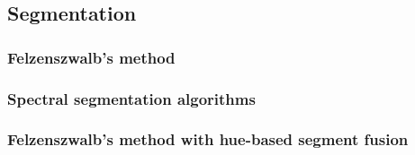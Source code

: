 \subsection{Segmentation}
\subsubsection{Felzenszwalb's method}

\subsubsection{Spectral segmentation algorithms}

\subsubsection{Felzenszwalb's method with hue-based segment fusion}
